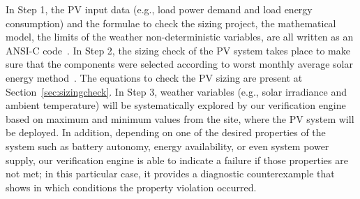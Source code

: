 \documentclass[review]{elsarticle}
\begin{document}
In Step 1, the PV input data (e.g., load power demand and load energy consumption) and the formulae to check the sizing project, the mathematical model, the limits of the weather non-deterministic variables, are all written as an ANSI-C code~\cite{ANSI2018}. In Step 2, the sizing check of the PV system takes place to make sure that the components were selected according to worst monthly average solar energy method~\cite{Pinho}. The equations to check the PV sizing are present at Section~\ref{sec:sizingcheck}. 
%
In Step 3, weather variables (e.g., solar irradiance and ambient temperature) will be systematically explored by our verification engine based on maximum and minimum values from the site, where the PV system will be deployed. 
In addition, depending on one of the desired properties of the system such as battery autonomy, energy availability, or even system power supply, our verification engine is able to indicate a failure if those properties are not met; in this particular case, it provides a diagnostic counterexample that shows in which conditions the property violation occurred. 
\end{document}
